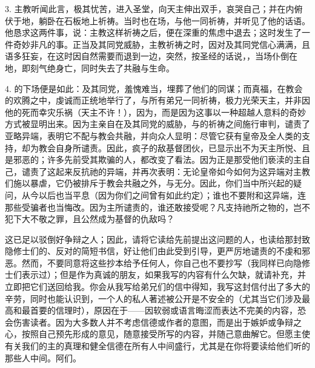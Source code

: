 3. 主教听闻此言，极其忧苦，进入圣堂，向天主伸出双手，哀哭自己；并在内俯伏于地，躺卧在石板地上祈祷。当时也在场，与他一同祈祷，并听见了他的话语。他恳求这两件事，说：主教这样祈祷之后，便在深重的焦虑中退去；这时发生了一件奇妙非凡的事。正当及其同党威胁，主教祈祷之时，因对及其同党信心满满，且语多狂妄，在这时因自然需要而退到一边，突然，按圣经的话说，，当场仆倒在地，即刻气绝身亡，同时失去了共融与生命。\par

4. 的下场便是如此：及其同党，羞愧难当，埋葬了他们的同谋；而真福，在教会的欢腾之中，虔诚而正统地举行了，与所有弟兄一同祈祷，极力光荣天主，并非因他的死而幸灾乐祸（天主不许！），因为，而是因为这事以一种超越人意料的奇妙方式被显明出来。因为主亲自在及其同党的威胁，与的祈祷之间施行审判，谴责了亚略异端，表明它不配与教会共融，并向众人显明：尽管它获有皇帝及全人类的支持，却为教会自身所谴责。因此，疯子的敌基督团伙，已显示出不为天主所悦、且是邪恶的；许多先前受其欺骗的人，都改变了看法。因为正是那受他们亵渎的主自己，谴责了这起来反抗祂的异端，并再次表明：无论皇帝如今如何为这异端对主教们施以暴虐，它仍被排斥于教会共融之外，与无分。因此，你们当中所兴起的疑问，从今以后也当平息（因为你们之间曾有如此约定）；谁也不要附和这异端，连那些受骗者也当悔改。因为主所谴责的，谁还敢接受呢？凡支持祂所之物的，岂不犯下大不敬之罪，且公然成为基督的仇敌吗？\par

这已足以驳倒好争辩之人；因此，请将它读给先前提出这问题的人，也读给那封致隐修士们的、反对的简短书信，好让他们由此受到引导，更严厉地谴责的不虔和邪恶。然而，不要同意将这些抄本给予任何人，你自己也不要抄写（我同样已向隐修士们表示过）；但是作为真诚的朋友，如果我写的内容有什么欠缺，就请补充，并立即把它们送回给我。你会从我写给弟兄们的信中得知，我写这封信付出了多大的辛劳，同时也能认识到，一个人的私人著述被公开是不安全的（尤其当它们涉及最高和最首要的信理时），原因在于——因软弱或语言晦涩而表达不完美的内容，恐会伤害读者。因为大多数人并不考虑信德或作者的意图，而是出于嫉妒或争辩之心，按照自己预先形成的意见，随意接受所写的内容，并随己意曲解它。但愿主使有关我们的主的真理和健全信德在所有人中间盛行，尤其是在你将要读给他们听的那些人中间。阿们。\par

